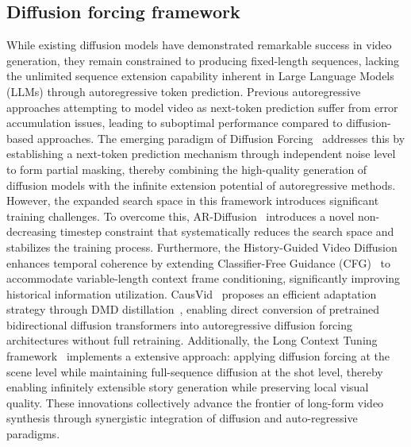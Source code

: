 \documentclass{article}
\begin{document}
\subsection{Diffusion forcing framework}
While existing diffusion models have demonstrated remarkable success in video generation, they remain constrained to producing fixed-length sequences, lacking the unlimited sequence extension capability inherent in Large Language Models (LLMs) through autoregressive token prediction. Previous autoregressive approaches attempting to model video as next-token prediction suffer from error accumulation issues, leading to suboptimal performance compared to diffusion-based approaches. The emerging paradigm of Diffusion Forcing~\cite{chen2024diffusionforcingnexttokenprediction} addresses this by establishing a next-token prediction mechanism through independent noise level to form partial masking, thereby combining the high-quality generation of diffusion models with the infinite extension potential of autoregressive methods. However, the expanded search space in this framework introduces significant training challenges. To overcome this, AR-Diffusion~\cite{sun2025ardiffusionasynchronousvideogeneration} introduces a novel non-decreasing timestep constraint that systematically reduces the search space and stabilizes the training process. Furthermore, the History-Guided Video Diffusion~\cite{song2025historyguidedvideodiffusion} enhances temporal coherence by extending Classifier-Free Guidance (CFG)~\cite{ho2022classifierfreediffusionguidance} to accommodate variable-length context frame conditioning, significantly improving historical information utilization. CausVid~\cite{yin2025slowbidirectionalfastautoregressive} proposes an efficient adaptation strategy through DMD distillation~\cite{yin2024onestepdiffusiondistributionmatching,yin2024improveddistributionmatchingdistillation}, enabling direct conversion of pretrained bidirectional diffusion transformers into autoregressive diffusion forcing architectures without full retraining. Additionally, the Long Context Tuning framework~\cite{guo2025longcontexttuningvideo} implements a extensive approach: applying diffusion forcing at the scene level while maintaining full-sequence diffusion at the shot level, thereby enabling infinitely extensible story generation while preserving local visual quality. These innovations collectively advance the frontier of long-form video synthesis through synergistic integration of diffusion and auto-regressive paradigms.
\end{document}
